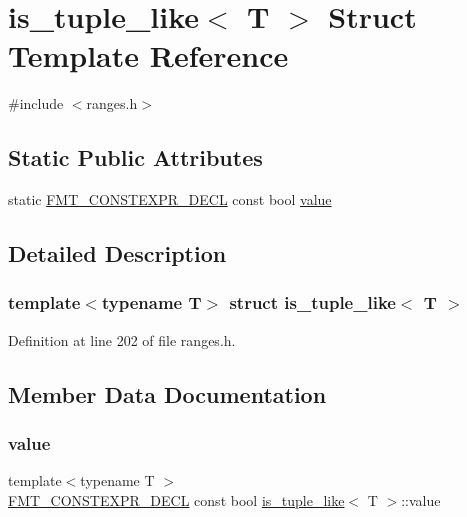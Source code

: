 \hypertarget{structis__tuple__like}{}\section{is\+\_\+tuple\+\_\+like$<$ T $>$ Struct Template Reference}
\label{structis__tuple__like}


{\ttfamily \#include $<$ranges.\+h$>$}

\subsection*{Static Public Attributes}
\begin{DoxyCompactItemize}
\item 
static \hyperlink{core_8h_af4388801466a5994a363d6005616371a}{F\+M\+T\+\_\+\+C\+O\+N\+S\+T\+E\+X\+P\+R\+\_\+\+D\+E\+CL} const bool \hyperlink{structis__tuple__like_a654492808e520413a641c3f470b7c589}{value}
\end{DoxyCompactItemize}


\subsection{Detailed Description}
\subsubsection*{template$<$typename T$>$\newline
struct is\+\_\+tuple\+\_\+like$<$ T $>$}



Definition at line 202 of file ranges.\+h.



\subsection{Member Data Documentation}
\mbox{\label{structis__tuple__like_a654492808e520413a641c3f470b7c589}} 
\subsubsection{\texorpdfstring{value}{value}}
{\footnotesize\ttfamily template$<$typename T $>$ \\
\hyperlink{core_8h_af4388801466a5994a363d6005616371a}{F\+M\+T\+\_\+\+C\+O\+N\+S\+T\+E\+X\+P\+R\+\_\+\+D\+E\+CL} const bool \hyperlink{structis__tuple__like}{is\+\_\+tuple\+\_\+like}$<$ T $>$\+::value\hspace{0.3cm}{\ttfamily [static]}}

